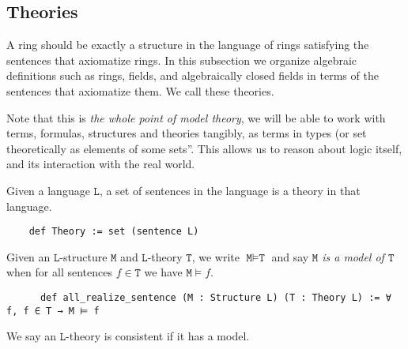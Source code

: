 \subsection{Theories}

A ring should be exactly a structure in the language of rings satisfying the
sentences that axiomatize rings.
In this subsection we organize algebraic definitions such as rings, fields,
and algebraically closed fields in terms of the sentences that axiomatize them.
We call these theories.

Note that this is \textit{the whole point of model theory},
we will be able to work with terms, formulas, structures and theories tangibly,
as terms in types (or set theoretically as elements of some sets''.
This allows us to reason about logic itself,
and its interaction with the real world.

\begin{dfn}
  Given a language $\texttt{L}$,
  a set of sentences in the language is a theory in that language.
  \begin{lstlisting}
    def Theory := set (sentence L)   \end{lstlisting}

    Given an $\texttt{L}$-structure $\texttt{M}$ and $\texttt{L}$-theory $\texttt{T}$,
    we write $\texttt{M} \vDash \texttt{T}$ and say
    \emph{$\texttt{M}$ is a model of $\texttt{T}$} when
    for all sentences $f \in \texttt{T}$ we have $\texttt{M} \vDash f$.

    \begin{lstlisting}
      def all_realize_sentence (M : Structure L) (T : Theory L) := ∀ f, f ∈ T → M ⊨ f \end{lstlisting}

    We say an $\texttt{L}$-theory is consistent if it has a model.
  \end{dfn}

